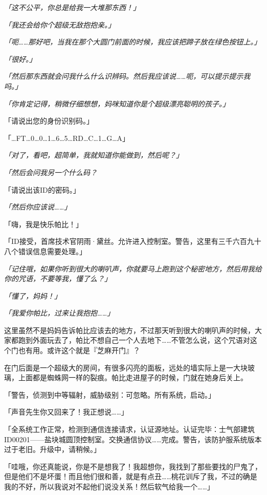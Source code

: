 \emph{「这不公平，你总是给我一大堆那东西！」}

\emph{「我还会给你个超级无敌抱抱亲。」}

\emph{「呃……那好吧，当我在那个大圆门前面的时候，我应该把蹄子放在绿色按钮上。」}

\emph{「很好。」}

\emph{「然后那东西就会问我什么什么识辨码。然后我应该说……呃，可以提示提示我吗。」}

\emph{「你肯定记得，稍微仔细想想，妈咪知道你是个超级漂亮聪明的孩子。」}

{\mt 「请说出您的身份识别码。」}

「\dots FT\dots 0\dots 0\dots 1\dots 6\dots 5\dots RD\dots C\dots 1\dots G\dots A」

\emph{「对了，看吧，超简单，我就知道你能做到，然后呢？」}

\emph{「然后会问我另一个什么码？}

{\mt 「请说出该ID的密码。」}

\emph{「然后你应该说……」}

「嗨，我是快乐帕比！」

{\mt 「ID接受，首席技术官阴雨·黛丝。允许进入控制室。警告，这里有三千六百九十八个错误信息需要处理。」}

\emph{「记住哦，如果你听到很大的喇叭声，你就要马上跑到这个秘密地方，然后用我给你的咒语，不要等我，懂了么？」}

\emph{「懂了，妈妈！」}

\emph{「我爱你帕比，过来让我抱抱……」}

这里虽然不是妈妈告诉帕比应该去的地方，不过那天听到很大的喇叭声的时候，大家都跑到外面玩去了，帕比不想自己一个人去地下……不管怎么说，这个咒语对这个门也有用。或许这个就是『芝麻开门』？

在门后面是一个超级大的房间，有很多闪亮的面板，远处的墙实际上是一大块玻璃，上面都是蜘蛛网一样的裂痕。帕比走进屋子的时候，门就在她身后关上。

「{\mt 警告，侦测到中等辐射，威胁级别：可忽略。所有系统，启动。}」

「声音先生你又回来了！我正想说……」

「{\mt 全系统工作正常，检测到通信连接请求，认证源地址。认证完毕：士气部建筑ID00201——盐块城圆顶控制室。交换通信协议……完成。警告，该防护服系统版本过于老旧。升级中，请稍候。}」

「哇哦，你还真能说，你是不是想我了！我超想你，我找到了那些要找的尸鬼了，但是他们不是坏蛋！而且他们很和善，就是有点丑……桃花训斥了我，不过的确是我的不好，所以我说对不起他们说没关系！然后软气给我一个……」

